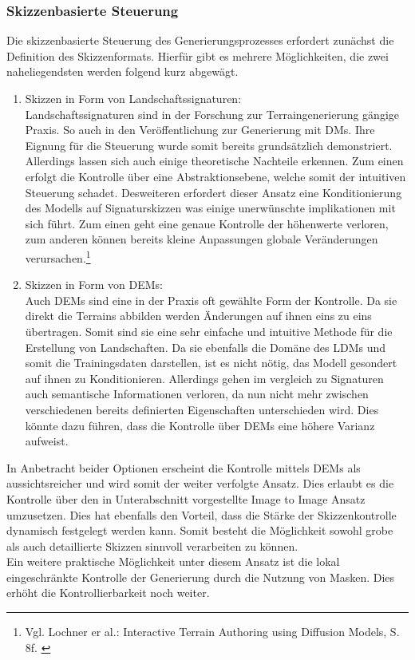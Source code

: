 \subsubsection {Skizzenbasierte Steuerung}

Die skizzenbasierte Steuerung des Generierungsprozesses erfordert zunächst die Definition des Skizzenformats. Hierfür gibt es mehrere Möglichkeiten, die zwei naheliegendsten werden folgend kurz abgewägt. 
\begin{enumerate}
    \item Skizzen in Form von Landschaftssignaturen: \\
    Landschaftssignaturen sind in der Forschung zur Terraingenerierung gängige Praxis. So auch in den Veröffentlichung zur Generierung mit DMs. Ihre Eignung für die Steuerung wurde somit bereits grundsätzlich demonstriert. \\
    Allerdings lassen sich auch einige theoretische Nachteile erkennen. Zum einen erfolgt die Kontrolle über eine Abstraktionsebene, welche somit der intuitiven Steuerung schadet. Desweiteren erfordert dieser Ansatz eine Konditionierung des Modells auf Signaturskizzen was einige unerwünschte implikationen mit sich führt. Zum einen geht eine genaue Kontrolle der höhenwerte verloren, zum anderen können bereits kleine Anpassungen globale Veränderungen verursachen.\footnote{
        Vgl. Lochner er al.: Interactive Terrain Authoring using Diffusion Models, S. 8f. 
        \cite{lochner2023interactive}
    }
    \item Skizzen in Form von DEMs: \\
    Auch DEMs sind eine in der Praxis oft gewählte Form der Kontrolle. Da sie direkt die Terrains abbilden werden Änderungen auf ihnen eins zu eins übertragen. Somit sind sie eine sehr einfache und intuitive Methode für die Erstellung von Landschaften. Da sie ebenfalls die Domäne des LDMs und somit die Trainingsdaten darstellen, ist es nicht nötig, das Modell gesondert auf ihnen zu Konditionieren. Allerdings gehen im vergleich zu Signaturen auch semantische Informationen verloren, da nun nicht mehr zwischen verschiedenen bereits definierten Eigenschaften unterschieden wird.  Dies könnte dazu führen, dass die Kontrolle über DEMs eine höhere Varianz aufweist.
\end{enumerate}

In Anbetracht beider Optionen erscheint die Kontrolle mittels DEMs als aussichtsreicher und wird somit der weiter verfolgte Ansatz. Dies erlaubt es die Kontrolle über den in Unterabschnitt vorgestellte Image to Image Ansatz umzusetzen. Dies hat ebenfalls den Vorteil, dass die Stärke der Skizzenkontrolle dynamisch festgelegt werden kann. Somit besteht die Möglichkeit sowohl grobe als auch detaillierte Skizzen sinnvoll verarbeiten zu können. \\
Ein weitere praktische Möglichkeit unter diesem Ansatz ist die lokal eingeschränkte Kontrolle der Generierung durch die Nutzung von Masken. Dies erhöht die Kontrollierbarkeit noch weiter.



